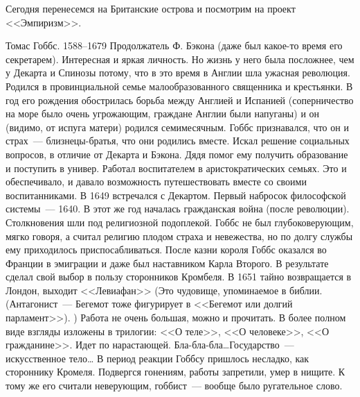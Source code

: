 Сегодня перенесемся на Британские острова и посмотрим на проект <<Эмпиризм>>.

Томас Гоббс. 1588--1679
Продолжатель Ф. Бэкона (даже был какое-то время его секретарем). Интересная и яркая личность. Но жизнь у него была посложнее, чем у Декарта и Спинозы потому, что в это время в Англии шла ужасная революция.
Родился в провинциальной семье малообразованного священника и крестьянки. В год его рождения обострилась борьба между Англией и Испанией (соперничество на море было очень угрожающим, граждане Англии были напуганы) и он (видимо, от испуга матери) родился семимесячным. Гоббс признавался, что он и страх~--- близнецы-братья, что они родились вместе. Искал решение социальных вопросов, в отличие от Декарта и Бэкона. Дядя помог ему получить образование и поступить в универ. Работал воспитателем в аристократических семьях. Это и обеспечивало, и давало возможность путешествовать вместе со своими воспитанниками. В 1649 встречался с Декартом. Первый набросок философской системы~--- 1640. В этот же год началась гражданская война (после революции). Столкновения шли под религиозной подоплекой. Гоббс не был глубоковерующим, мягко говоря, а считал религию плодом страха и невежества, но по долгу службы ему приходилось приспосабливаться. После казни короля Гоббс оказался во Франции в эмиграции и даже был наставником Карла Второго. В результате сделал свой выбор в пользу сторонников Кромбеля. 
В 1651 тайно возвращается в Лондон, выходит <<Левиафан>> (Это чудовище, упоминаемое в библии. (Антагонист~--- Бегемот тоже фигурирует в <<Бегемот или долгий парламент>>). ) Работа не очень большая, можно и прочитать. 
В более полном виде взгляды изложены в трилогии: <<О теле>>, <<О человеке>>, <<О гражданине>>. Идет по нарастающей. Бла-бла-бла\ldots Государство~--- искусственное тело\ldots
В период реакции Гоббсу пришлось несладко, как стороннику Кромеля. Подвергся гонениям, работы запретили, умер в нищите. К тому же его считали неверующим, гоббист~--- вообще было ругательное слово.

